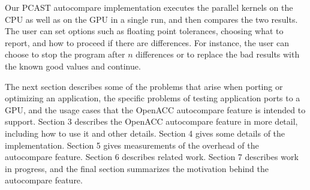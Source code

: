Our PCAST autocompare implementation executes the parallel kernels on the CPU as well as on the GPU in a single run, and then compares the two results.
The user can set options such as floating point tolerances, choosing what to report, and how to proceed if there are differences.
For instance, the user can choose to stop the program after $n$ differences or to replace the bad results with the known good values and continue.

The next section describes some of the problems that arise when porting or optimizing an application, the specific problems of testing application ports to a GPU, and the usage cases that the OpenACC autocompare feature is intended to support.
Section 3 describes the OpenACC autocompare feature in more detail, including how to use it and other details.
Section 4 gives some details of the implementation.
Section 5 gives measurements of the overhead of the autocompare feature.
Section 6 describes related work. 
Section 7 describes work in progress, and 
the final section summarizes the motivation behind the autocompare feature.




